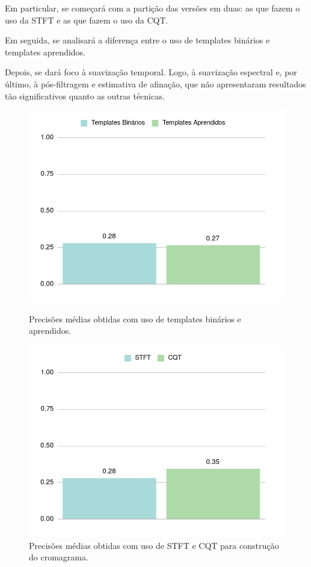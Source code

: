     Em particular, se começará com a partição das versões em duas: as que fazem o uso da STFT e as que fazem o uso da CQT.
    
    Em seguida, se analisará a diferença entre o uso de templates binários e templates aprendidos.
    
    Depois, se dará foco à suavização temporal. Logo, à suavização espectral e, por último, à pós-filtragem e estimativa de afinação, que não apresentaram resultados tão significativos quanto as outras técnicas.


    \begin{figure}[htb]
        \begin{center}
            \includegraphics[width=13cm]{figuras/01-templates-binarios-e-aprendidos.png}
            \caption{\label{fig:exp:templates}Precisões médias obtidas com uso de templates binários e aprendidos.}
        
            \includegraphics[width=13cm]{figuras/02-stft-e-cqt-com-templates-binarios.png}
            \caption{\label{fig:exp:chroma}Precisões médias obtidas com uso de STFT e CQT para construção do cromagrama.}
        \end{center}
    \end{figure}
    

